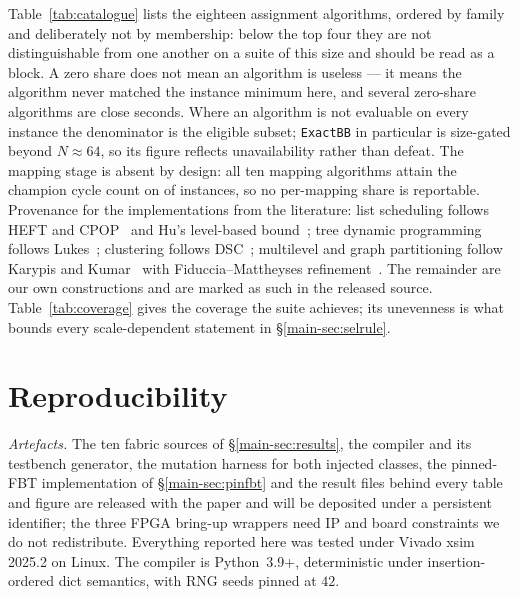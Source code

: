 \documentclass[journal,10pt]{IEEEtran}
\theoremstyle{plain}
\theoremstyle{definition}
\theoremstyle{remark}
\newcommand{\sv}[1]{\texttt{#1}}
\begin{document}
\begin{table}[!t]
\caption{Instance-suite cell counts by $N$-bucket and topology; rows and
  columns both sum to the \SuiteSize-instance total. \SuiteThinCells{} of the
  populated cells hold two instances or fewer and \SuiteEmptyCells{} are
  empty, which is the basis for L5.}
\label{tab:coverage}
\centering
\footnotesize
\renewcommand{\arraystretch}{1.15}

\end{table}

Table~\ref{tab:catalogue} lists the eighteen assignment algorithms, ordered
by family and deliberately not by membership: below the top four they are not
distinguishable from one another on a suite of this size and should be read as
a block. A zero share does not mean an algorithm is useless --- it means the
algorithm never matched the instance minimum here, and several zero-share
algorithms are close seconds. Where an algorithm is not evaluable on every
instance the denominator is the eligible subset; \sv{ExactBB} in particular is
size-gated beyond $N \approx 64$, so its figure reflects unavailability rather
than defeat. The mapping stage is absent by design: all ten mapping algorithms
attain the champion cycle count on \ClsAllMappings{} of \TournNInst{}
instances, so no per-mapping share is reportable. Provenance for the
implementations from the literature: list scheduling follows HEFT and
CPOP~\cite{topcuoglu2002heft} and Hu's level-based bound~\cite{hu1961parallel};
tree dynamic programming follows Lukes~\cite{lukes1974efficient}; clustering
follows DSC~\cite{yang1994dsc}; multilevel and graph partitioning follow
Karypis and Kumar~\cite{karypis1998multilevel} with Fiduccia--Mattheyses
refinement~\cite{fiduccia1982linear}. The remainder are our own constructions
and are marked as such in the released source. Table~\ref{tab:coverage} gives
the coverage the suite achieves; its unevenness is what bounds every
scale-dependent statement in \S\ref{main-sec:selrule}.

\section{Reproducibility}\label{app:repro}

\emph{Artefacts.} The ten fabric sources of \S\ref{main-sec:results}, the
compiler and its testbench generator, the mutation harness for both injected
classes, the pinned-FBT implementation of \S\ref{main-sec:pinfbt} and the result
files behind every table and figure are released with the paper and will be
deposited under a persistent identifier; the three FPGA bring-up wrappers need
IP and board constraints we do not redistribute. Everything reported here was
tested under Vivado xsim 2025.2 on Linux. The compiler is Python~3.9+,
deterministic under insertion-ordered dict semantics, with RNG seeds pinned at
$42$.
\end{document}
